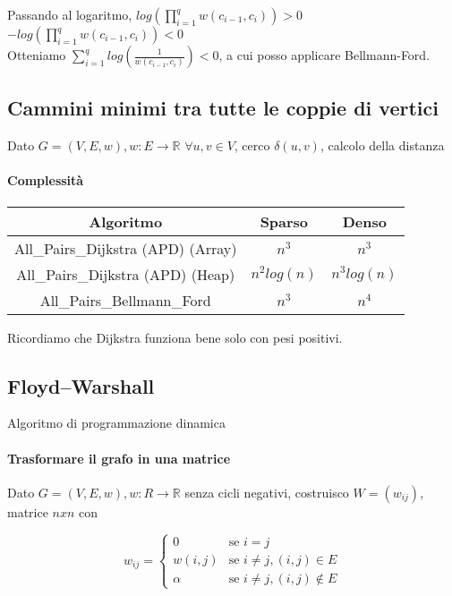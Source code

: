 Passando al logaritmo, $log(\prod_{i=1}^q{w(c_{i-1},c_i)}) > 0$ \\
$-log(\prod_{i=1}^q{w(c_{i-1},c_i)}) < 0$ \\
Otteniamo $\sum_{i=1}^q{log(\frac{1}{w(c_{i-1},c_i)})} < 0$, a cui posso applicare Bellmann-Ford.

\subsection{Cammini minimi tra tutte le coppie di vertici}

Dato $G=(V,E,w), w: E \rightarrow \mathbb{R}$
$\forall u,v \in V$, cerco $\delta(u,v)$, calcolo della distanza




\paragraph{Complessità}

\begin{tabular}{|c|c|c|}
\hline
Algoritmo & Sparso & Denso \\
\hline
All\_Pairs\_Dijkstra (APD) (Array) & $n^3$ & $n^3$ \\
\hline
All\_Pairs\_Dijkstra (APD) (Heap) & $n^2log(n)$ & $n^3log(n)$ \\
\hline
All\_Pairs\_Bellmann\_Ford & $n^3$ & $n^4$ \\
\hline
\end{tabular}

Ricordiamo che Dijkstra funziona bene solo con pesi positivi.

\subsection{Floyd–Warshall}

Algoritmo di programmazione dinamica

\paragraph{Trasformare il grafo in una matrice}

Dato $G=(V,E,w), w : R \rightarrow \mathbb{R}$ senza cicli negativi, costruisco $W=(w_{ij})$, matrice $nxn$ con

\begin{equation}
w_{ij} =
\begin{cases}
0 & \mbox{se } i=j \\
w(i,j) & \mbox{se } i\neq j, (i,j) \in E \\
\alpha & \mbox{se } i\neq j, (i,j) \notin E
\end{cases}
\end{equation}

